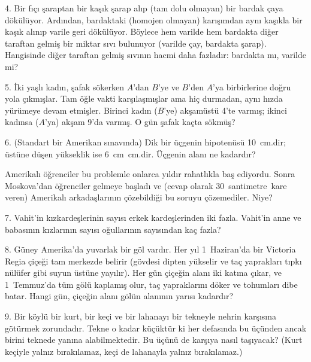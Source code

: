 \begin{problem}{4.}
Bir fıçı şaraptan bir kaşık şarap alıp  (tam dolu olmayan) bir bardak çaya dökülüyor. Ardından, bardaktaki (homojen olmayan) ka\-rı\-şım\-dan aynı kaşıkla bir kaşık alınıp varile geri dökülüyor. Böylece hem varilde hem bardakta diğer taraftan gelmiş bir miktar sıvı bu\-lu\-nu\-yor (varilde çay, bardakta şarap). Hangisinde diğer taraftan gelmiş sıvının hacmi daha fazladır: bardakta mı, varilde mi?
\end{problem}

\begin{problem}{5.}
İki yaşlı kadın, şafak sökerken $A$'dan $B$'ye ve $B$'den $A$'ya bir\-bir\-le\-ri\-ne doğru yola çıkmışlar. Tam öğle vakti karşılaşmışlar ama hiç durmadan, aynı hızda yürümeye devam etmişler. Birinci kadın ($B$'ye) akşamüstü 4'te varmış; ikinci kadınsa ($A$'ya) akşam 9'da varmış. O gün şafak kaçta sökmüş?
\end{problem}

\begin{problem}{6.}
(Standart bir Amerikan sınavında) Dik bir üçgenin hipotenüsü \SI{10}{\cm}.dir; üstüne düşen yükseklik ise \SI{6}{\cm}~cm.dir. Üçgenin alanı ne kadardır?

Amerikalı öğrenciler bu problemle onlarca yıldır  rahatlıkla baş ediyordu. Sonra Moskova'dan öğrenciler gelmeye başladı ve (cevap olarak 30~santimetre~kare veren) Amerikalı arkadaşlarının çözebildiği bu soruyu çözemediler. Niye?
\end{problem}

\begin{problem}{7.}
Vahit'in kızkardeşlerinin sayısı erkek kardeşlerinden iki fazla. Va\-hit'\-in anne ve babasının kızlarının sayısı oğullarının sayısından kaç fazla?
\end{problem}

\begin{problem}{8.}
Güney Amerika'da yuvarlak bir göl vardır. Her yıl 1~Haziran'da bir Victoria Regia çiçeği tam merkezde belirir (gövdesi dipten yükselir ve taç yaprakları tıpkı nülüfer gibi suyun üstüne yayılır). Her gün çiçeğin alanı iki katına çıkar, ve 1~Temmuz'da tüm gölü kaplamış olur, taç yapraklarını döker ve tohumları dibe batar. Hangi gün, çiçeğin alanı gölün alanının yarısı kadardır?
\end{problem}

\begin{problem}{9.}
Bir köylü bir kurt, bir keçi ve bir lahanayı bir tekneyle nehrin karşısına götürmek zorundadır. Tekne o kadar küçüktür ki her defasında
bu üçünden ancak birini  teknede yanına alabilmektedir.   Bu üçünü de karşıya nasıl taşıyacak? (Kurt keçiyle yalnız bırakılamaz, keçi de lahanayla yalnız bırakılamaz.)
\end{problem}

